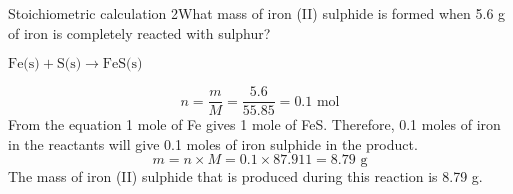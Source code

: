 \begin{wex}{Stoichiometric calculation 2}{What mass of iron (II) sulphide is formed when 5.6 g of iron is completely reacted with sulphur?}
{
\begin{center}
$\text{Fe(s)} + \text{S(s)} \rightarrow \text{FeS(s)}$
\end{center}
\begin{equation*}
n = \frac{m}{M} = \frac{5.6}{55.85} = 0.1 \text{ mol}
\end{equation*}
From the equation 1 mole of Fe gives 1 mole of FeS. Therefore, 0.1 moles of iron in the reactants will give 0.1 moles of iron sulphide in the product.
\begin{equation*}
m = n \times M = 0.1 \times 87.911 = 8.79 \text{ g}
\end{equation*}
The mass of iron (II) sulphide that is produced during this reaction is 8.79 g.}
\end{wex}

